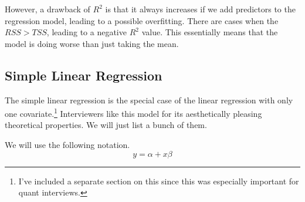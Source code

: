   However, a drawback of $R^2$ is that it always increases if we add predictors to the regression model, leading to a possible overfitting. There are cases when the $RSS > TSS$, leading to a negative $R^2$ value. This essentially means that the model is doing worse than just taking the mean. 

\subsection{Simple Linear Regression}

  The simple linear regression is the special case of the linear regression with only one covariate.\footnote{I've included a separate section on this since this was especially important for quant interviews.} Interviewers like this model for its aesthetically pleasing theoretical properties. We will just list a bunch of them. 


  \begin{definition}
    We will use the following notation. 
    \begin{equation}
      y = \alpha + x \beta
    \end{equation}
  \end{definition}

